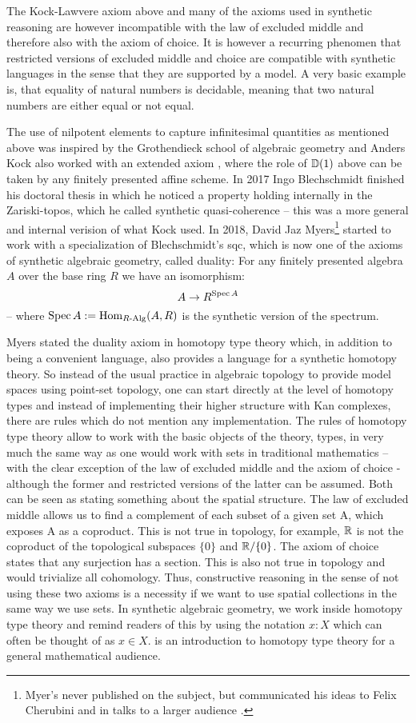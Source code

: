 The Kock-Lawvere axiom above and many of the axioms used in synthetic reasoning are however incompatible with the law of excluded middle and therefore also with the axiom of choice. It is however a recurring phenomen that restricted versions of excluded middle and choice are compatible with synthetic languages in the sense that they are supported by a model. A very basic example is, that equality of natural numbers is decidable, meaning that two natural numbers are either equal or not equal. 

The use of nilpotent elements to capture infinitesimal quantities as mentioned above was inspired by the Grothendieck school of algebraic geometry and Anders Kock also worked with an extended axiom \cite{Kock74}, where the role of $\mathbb{D}(1)$ above can be taken by any finitely presented affine scheme. In 2017 Ingo Blechschmidt finished his doctoral thesis in which he noticed a property holding internally in the Zariski-topos, which he called synthetic quasi-coherence -- this was a more general and internal verision of what Kock used. In 2018, David Jaz Myers\footnote{Myer's never published on the subject, but communicated his ideas to Felix Cherubini and in talks to a larger audience \cite{myers-talk1,myers-talk2}.} started to work with a specialization of Blechschmidt's sqc, which is now one of the axioms of synthetic algebraic geometry, called duality: For any finitely presented algebra $A$ over the base ring $R$ we have an isomorphism:
\[ A\to R^{\operatorname{Spec} A}\]
-- where $\operatorname{Spec} A:=\mathrm{Hom}_{R\text{-}\mathrm{Alg}}(A,R)$ is the synthetic version of the spectrum.

Myers stated the duality axiom in homotopy type theory which, in addition to being a convenient language, also provides a language for a synthetic homotopy theory.
So instead of the usual practice in algebraic topology to provide model spaces using point-set topology, one can start directly at the level of homotopy types and instead of implementing their higher structure with Kan complexes, there are rules which do not mention any implementation.
The rules of homotopy type theory allow to work with the basic objects of the theory, types, in very much the same way as one would work with sets in traditional mathematics -- with the clear exception of the law of excluded middle and the axiom of choice - although the former and restricted versions of the latter can be assumed.
Both can be seen as stating something about the spatial structure. The law of excluded middle allows us to find a complement of each subset of a given set A, which exposes A as a coproduct.
This is not true in topology, for example, $\mathbb{R}$ is not the coproduct of the topological subspaces $\{0\}$ and $\mathbb{R}/\{0\}$.
The axiom of choice states that any surjection has a section. This is also not true in topology and would trivialize all cohomology.
Thus, constructive reasoning in the sense of not using these two axioms is a necessity if we want to use spatial collections in the same way we use sets.
In synthetic algebraic geometry, we work inside homotopy type theory and remind readers of this by using the notation $x:X$ which can often be thought of as $x\in X$.
\cite{shulman-logic-of-spaces} is an introduction to homotopy type theory for a general mathematical audience.


